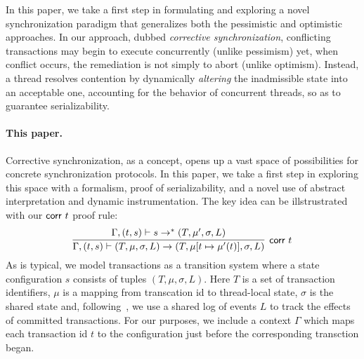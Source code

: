 %
In this paper, we take a first step in formulating and exploring a novel synchronization paradigm that generalizes both the pessimistic and optimistic approaches.
%
In our approach, dubbed \emph{corrective synchronization}, conflicting transactions may begin to execute concurrently (unlike pessimism) yet, when conflict occurs, the remediation is not simply to abort (unlike optimism). Instead, a thread resolves contention by dynamically \emph{altering} the inadmissible state into an acceptable one, accounting for the behavior of concurrent threads, so as to guarantee serializability.





\paragraph{This paper.} Corrective synchronization, as a concept, opens up a vast space of possibilities for concrete synchronization protocols. In this paper, we take a first step in exploring this space with a formalism, proof of serializability, and a novel use of abstract interpretation and dynamic instrumentation.
%
The key idea can be illstrustrated with our ${\sf corr}\ t$ proof rule:
$$
\infer[\text{{\sf corr }} t]{\Gamma, (t,s) \vdash (T, \mu, \sigma, L) \rightarrow (T,\mu[t \mapsto \mu'(t)], \sigma, L)}{
   \Gamma, (t,s) \vdash
	s \rightarrow^{*} (T,\mu', \sigma, L)}
$$
As is typical, we model transactions as a transition system
where a state configuration $s$ consists of tuples $(T,\mu,\sigma,L)$.
Here $T$ is a set of transaction identifiers,  $\mu$ is a mapping from
transcation id to thread-local state, $\sigma$ is the shared state
and, following~\cite{KoskinenP15}, we use a shared log of events $L$ to track the
effects of committed transactions.
%
For our purposes, we include a context $\Gamma$ which maps each transaction
id $t$ to the configuration just before the corresponding transction began.

